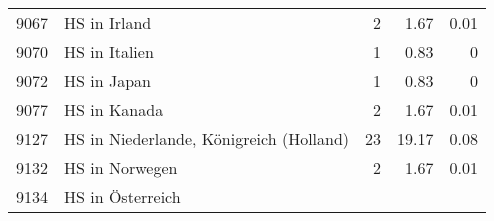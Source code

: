 \begin{longtable}{lXrrr}
     9067 &
     \multicolumn{1}{X}{ HS in Irland   } &


       \num{2} &
       \num[round-mode=places,round-precision=2]{1,67} &
         \num[round-mode=places,round-precision=2]{0,01} \\

     9070 &
     \multicolumn{1}{X}{ HS in Italien   } &


       \num{1} &
       \num[round-mode=places,round-precision=2]{0,83} &
         \num[round-mode=places,round-precision=2]{0} \\

     9072 &
     \multicolumn{1}{X}{ HS in Japan   } &


       \num{1} &
       \num[round-mode=places,round-precision=2]{0,83} &
         \num[round-mode=places,round-precision=2]{0} \\

     9077 &
     \multicolumn{1}{X}{ HS in Kanada   } &


       \num{2} &
       \num[round-mode=places,round-precision=2]{1,67} &
         \num[round-mode=places,round-precision=2]{0,01} \\

     9127 &
     \multicolumn{1}{X}{ HS in Niederlande, Königreich (Holland)   } &


       \num{23} &
       \num[round-mode=places,round-precision=2]{19,17} &
         \num[round-mode=places,round-precision=2]{0,08} \\

     9132 &
     \multicolumn{1}{X}{ HS in Norwegen   } &


       \num{2} &
       \num[round-mode=places,round-precision=2]{1,67} &
         \num[round-mode=places,round-precision=2]{0,01} \\

     9134 &
     \multicolumn{1}{X}{ HS in Österreich   } &



\end{longtable}
